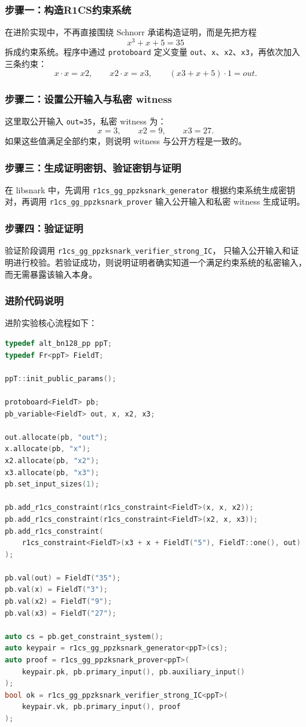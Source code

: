 \documentclass[a4paper]{article}
\begin{document}
\subsubsection{步骤一：构造R1CS约束系统}
在进阶实现中，不再直接围绕 Schnorr 承诺构造证明，而是先把方程
\[
x^3+x+5=35
\]
拆成约束系统。程序中通过 \texttt{protoboard} 定义变量 \texttt{out}、\texttt{x}、\texttt{x2}、\texttt{x3}，再依次加入三条约束：
\[
x\cdot x=x2,\qquad x2\cdot x=x3,\qquad (x3+x+5)\cdot 1=out.
\]

\subsubsection{步骤二：设置公开输入与私密 witness}
这里取公开输入 \texttt{out=35}，私密 witness 为：
\[
x=3,\qquad x2=9,\qquad x3=27.
\]
如果这些值满足全部约束，则说明 witness 与公开方程是一致的。

\subsubsection{步骤三：生成证明密钥、验证密钥与证明}
在 libsnark 中，先调用
\texttt{r1cs\_gg\_ppzksnark\_generator}
根据约束系统生成密钥对，再调用
\texttt{r1cs\_gg\_ppzksnark\_prover}
输入公开输入和私密 witness 生成证明。

\subsubsection{步骤四：验证证明}
验证阶段调用
\texttt{r1cs\_gg\_ppzksnark\_verifier\_strong\_IC}，
只输入公开输入和证明进行校验。若验证成功，则说明证明者确实知道一个满足约束系统的私密输入，而无需暴露该输入本身。

\subsubsection{进阶代码说明}
进阶实验核心流程如下：

\begin{lstlisting}[language=C++,caption={libsnark进阶实现核心流程}]
typedef alt_bn128_pp ppT;
typedef Fr<ppT> FieldT;

ppT::init_public_params();

protoboard<FieldT> pb;
pb_variable<FieldT> out, x, x2, x3;

out.allocate(pb, "out");
x.allocate(pb, "x");
x2.allocate(pb, "x2");
x3.allocate(pb, "x3");
pb.set_input_sizes(1);

pb.add_r1cs_constraint(r1cs_constraint<FieldT>(x, x, x2));
pb.add_r1cs_constraint(r1cs_constraint<FieldT>(x2, x, x3));
pb.add_r1cs_constraint(
    r1cs_constraint<FieldT>(x3 + x + FieldT("5"), FieldT::one(), out)
);

pb.val(out) = FieldT("35");
pb.val(x) = FieldT("3");
pb.val(x2) = FieldT("9");
pb.val(x3) = FieldT("27");

auto cs = pb.get_constraint_system();
auto keypair = r1cs_gg_ppzksnark_generator<ppT>(cs);
auto proof = r1cs_gg_ppzksnark_prover<ppT>(
    keypair.pk, pb.primary_input(), pb.auxiliary_input()
);
bool ok = r1cs_gg_ppzksnark_verifier_strong_IC<ppT>(
    keypair.vk, pb.primary_input(), proof
);
\end{lstlisting}
\end{document}
